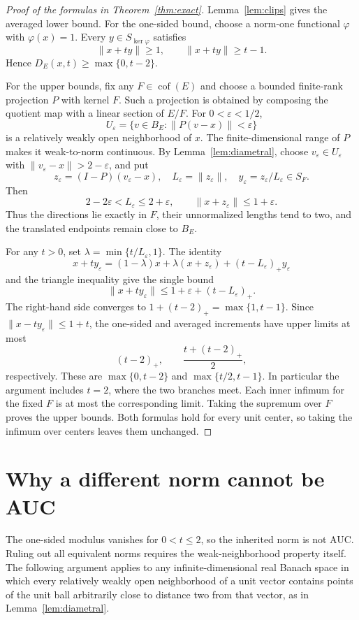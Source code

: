 \begin{proof}[Proof of the formulas in Theorem~\ref{thm:exact}]
Lemma~\ref{lem:clips} gives the averaged lower bound.  For the one-sided
bound, choose a norm-one functional $\varphi$ with
$\varphi(x)=1$.  Every $y\in S_{\ker\varphi}$ satisfies
\[
 \|x+ty\|\ge1,\qquad \|x+ty\|\ge t-1.
\]
Hence $D_E(x,t)\ge\max\{0,t-2\}$.

For the upper bounds, fix any $F\in\operatorname{cof}(E)$ and choose a
bounded finite-rank projection $P$ with kernel $F$.  Such a projection
is obtained by composing the quotient map with a linear section of
$E/F$.  For $0<\varepsilon<1/2$,
\[
 U_\varepsilon=\{v\in B_E:\|P(v-x)\|<\varepsilon\}
\]
is a relatively weakly open neighborhood of $x$.  The finite-dimensional
range of $P$ makes it weak-to-norm continuous.  By
Lemma~\ref{lem:diametral}, choose $v_\varepsilon\in U_\varepsilon$ with
$\|v_\varepsilon-x\|>2-\varepsilon$, and put
\[
 z_\varepsilon=(I-P)(v_\varepsilon-x),\quad
 L_\varepsilon=\|z_\varepsilon\|,\quad
 y_\varepsilon=z_\varepsilon/L_\varepsilon\in S_F.
\]
Then
\[
 2-2\varepsilon<L_\varepsilon\le2+\varepsilon,
 \qquad \|x+z_\varepsilon\|\le1+\varepsilon.
\]
Thus the directions lie exactly in $F$, their unnormalized lengths tend
to two, and the translated endpoints remain close to $B_E$.

For any $t>0$, set $\lambda=\min\{t/L_\varepsilon,1\}$.  The identity
\[
 x+t y_\varepsilon
 =(1-\lambda)x+\lambda(x+z_\varepsilon)
       +(t-L_\varepsilon)_+y_\varepsilon
\]
and the triangle inequality give the single bound
\[
 \|x+t y_\varepsilon\|
 \le1+\varepsilon+(t-L_\varepsilon)_+.
\]
The right-hand side converges to $1+(t-2)_+=\max\{1,t-1\}$.  Since
$\|x-t y_\varepsilon\|\le1+t$, the one-sided and averaged increments
have upper limits at most
\[
 (t-2)_+,\qquad \frac{t+(t-2)_+}{2},
\]
respectively.  These are $\max\{0,t-2\}$ and
$\max\{t/2,t-1\}$.  In particular the argument includes $t=2$, where
the two branches meet.  Each inner infimum for the fixed $F$ is at most
the corresponding limit.  Taking the supremum over $F$ proves the
upper bounds.  Both formulas hold for every unit center, so taking the
infimum over centers leaves them unchanged.
\end{proof}

\section{Why a different norm cannot be AUC}\label{sec:renorming}

The one-sided modulus vanishes for $0<t\le2$, so the inherited norm is not AUC.
Ruling out all equivalent norms requires the weak-neighborhood
property itself. The following argument applies to any infinite-dimensional
real Banach space in which every relatively weakly open neighborhood of a unit
vector contains points of the unit ball arbitrarily close to distance
two from that vector, as in Lemma~\ref{lem:diametral}.

